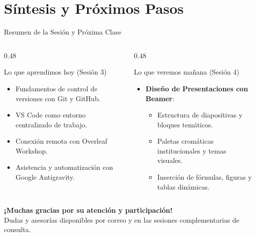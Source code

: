 \documentclass[aspectratio=169, 10pt]{beamer}
\begin{document}
\section[Cierre]{Síntesis y Próximos Pasos}

\begin{frame}{Resumen de la Sesión y Próxima Clase}
  \begin{columns}[T]
    \begin{column}{0.48\textwidth}
      \begin{block}{Lo que aprendimos hoy (Sesión 3)}
        \small
        \begin{itemize}
          \item Fundamentos de control de versiones con Git y GitHub.
          \item VS Code como entorno centralizado de trabajo.
          \item Conexión remota con Overleaf Workshop.
          \item Asistencia y automatización con Google Antigravity.
        \end{itemize}
      \end{block}
    \end{column}

    \begin{column}{0.48\textwidth}
      \begin{exampleblock}{Lo que veremos mañana (Sesión 4)}
        \small
        \begin{itemize}
          \item \textbf{Diseño de Presentaciones con Beamer}:
          \begin{itemize}\footnotesize
            \item Estructura de diapositivas y bloques temáticos.
            \item Paletas cromáticas institucionales y temas visuales.
            \item Inserción de fórmulas, figuras y tablas dinámicas.
          \end{itemize}
        \end{itemize}
      \end{exampleblock}
    \end{column}
  \end{columns}

  \vspace{0.15cm}
  \begin{center}
    \textbf{\small ¡Muchas gracias por su atención y participación!}\\[0.2ex]
    \scriptsize Dudas y asesorías disponibles por correo y en las sesiones complementarias de consulta.
  \end{center}
\end{frame}
\end{document}
